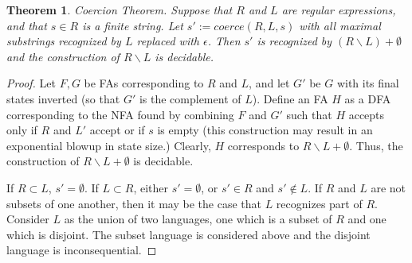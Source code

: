 \documentclass[10pt,preprint]{sigplanconf}
\newtheorem{thm}{Theorem}
\theoremstyle{definition}
\begin{document}
\begin{thm}{Coercion Theorem.} \label{thm:coerce}
Suppose that $R$ and $L$ are regular expressions, and that $s \in R$ is a finite string.  Let $s' := coerce(R,L,s)$ with all maximal substrings recognized by $L$ replaced with $\epsilon$.  Then $s'$ is recognized by $(R \backslash L) + \emptyset$ and the construction of $R \backslash L$ is decidable.
\end{thm}
\begin{proof}
Let $F,G$ be FAs corresponding to $R$ and $L$, and let $G'$ be $G$ with its final states inverted (so that $G'$ is the complement of $L$).  Define an FA $H$ as a DFA corresponding to the NFA found by combining $F$ and $G'$ such that $H$ accepts only if $R$ and $L'$ accept or if $s$ is empty (this construction may result in an exponential blowup in state size.)  Clearly, $H$ corresponds to $R \backslash L + \emptyset$.  Thus, the construction of $R \backslash L + \emptyset$ is decidable.

If $R \subset L$, $s' = \emptyset$.  If $L \subset R$, either $s' = \emptyset$, or $s' \in R$ and $s' \not \in L$. If $R$ and $L$ are not subsets of one another, then it may be the case that $L$ recognizes part of $R$.  Consider $L$ as the union of two languages, one which is a subset of $R$ and one which is disjoint.  The subset language is considered above and the disjoint language is inconsequential.
\end{proof}
\end{document}
